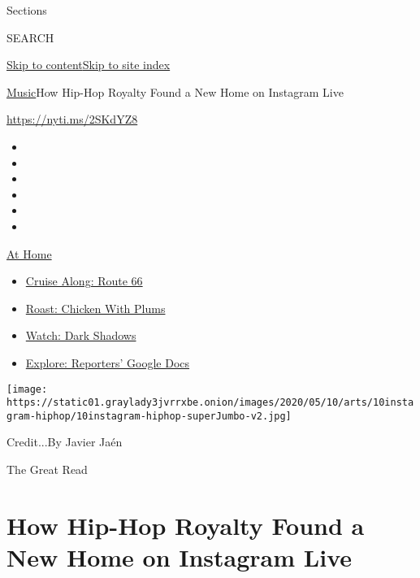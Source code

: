 Sections

SEARCH

\protect\hyperlink{site-content}{Skip to
content}\protect\hyperlink{site-index}{Skip to site index}

\href{/section/arts/music}{Music}\textbar{}How Hip-Hop Royalty Found a
New Home on Instagram Live

\url{https://nyti.ms/2SKdYZ8}

\begin{itemize}
\item
\item
\item
\item
\item
\item
\end{itemize}

\href{https://www.nytimes3xbfgragh.onion/spotlight/at-home?action=click\&pgtype=Article\&state=default\&region=TOP_BANNER\&context=at_home_menu}{At
Home}

\begin{itemize}
\tightlist
\item
  \href{https://www.nytimes3xbfgragh.onion/2020/09/07/travel/route-66.html?action=click\&pgtype=Article\&state=default\&region=TOP_BANNER\&context=at_home_menu}{Cruise
  Along: Route 66}
\item
  \href{https://www.nytimes3xbfgragh.onion/2020/09/04/dining/sheet-pan-chicken.html?action=click\&pgtype=Article\&state=default\&region=TOP_BANNER\&context=at_home_menu}{Roast:
  Chicken With Plums}
\item
  \href{https://www.nytimes3xbfgragh.onion/2020/09/04/arts/television/dark-shadows-stream.html?action=click\&pgtype=Article\&state=default\&region=TOP_BANNER\&context=at_home_menu}{Watch:
  Dark Shadows}
\item
  \href{https://www.nytimes3xbfgragh.onion/interactive/2020/at-home/even-more-reporters-editors-diaries-lists-recommendations.html?action=click\&pgtype=Article\&state=default\&region=TOP_BANNER\&context=at_home_menu}{Explore:
  Reporters' Google Docs}
\end{itemize}

\texttt{[image: https://static01.graylady3jvrrxbe.onion/images/2020/05/10/arts/10instagram-hiphop/10instagram-hiphop-superJumbo-v2.jpg]}

Credit...By Javier Jaén

The Great Read

\hypertarget{how-hip-hop-royalty-found-a-new-home-on-instagram-live}{%
\section{How Hip-Hop Royalty Found a New Home on Instagram
Live}\label{how-hip-hop-royalty-found-a-new-home-on-instagram-live}}

